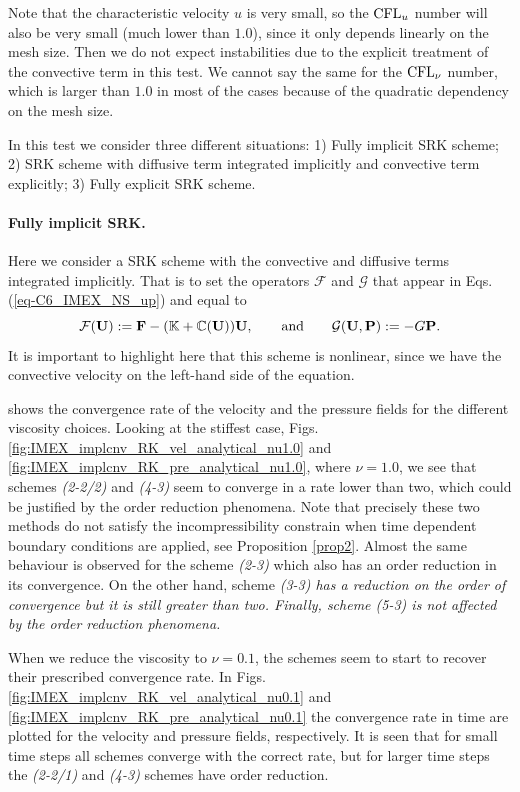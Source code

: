 Note that the characteristic velocity $u$ is very small, so the ${\rm CFL}_u$ number will also be very small (much lower than $1.0$), since it only depends linearly on the mesh size. Then we do not expect instabilities due to the explicit treatment of the convective term in this test. We cannot say the same for the ${\rm CFL}_\nu$ number, which is larger than $1.0$ in most of the cases because of the quadratic dependency on the mesh size.

In this test we consider three different situations: 1) Fully implicit SRK scheme; 2) SRK scheme with diffusive term integrated implicitly and convective term explicitly; 3) Fully explicit SRK scheme.

\paragraph{Fully implicit SRK.}

Here we consider a SRK scheme with the convective and diffusive terms integrated implicitly. That is to set the operators $\mathcal{F}$ and $\mathcal{G}$ that appear in Eqs. (\ref{eq-C6_IMEX_NS_up}) and  equal to
$$\mathcal{F}({\bf U}):={\bf F}-(\mathbb{K}+\mathbb{C}({\bf U})){\bf U},\quad\quad\mbox{and}\quad\quad\mathcal{G}({\bf U},{\bf P}):=-G{\bf P}.$$
It is important to highlight here that this scheme is nonlinear, since we have the convective velocity on the left-hand side of the equation.

 shows the convergence rate of the velocity and the pressure fields for the different viscosity choices. Looking at the stiffest case, Figs. \ref{fig:IMEX_implcnv_RK_vel_analytical_nu1.0} and \ref{fig:IMEX_implcnv_RK_pre_analytical_nu1.0}, where $\nu=1.0$, we see that schemes \textit{(2-2/2)} and \textit{(4-3)} seem to converge in a rate lower than two, which could be justified by the order reduction phenomena. Note that precisely these two methods do not satisfy the incompressibility constrain when time dependent boundary conditions are applied, see Proposition \ref{prop2}. Almost the same behaviour is observed for the scheme \textit{(2-3)} which also has an order reduction in its convergence. On the other hand, scheme \textit{(3-3) has a reduction on the order of convergence but it is still greater than two. Finally, scheme \textit{(5-3)} is not affected by the order reduction phenomena.}

When we reduce the viscosity to $\nu=0.1$, the schemes seem to start to recover their prescribed convergence rate. In Figs. \ref{fig:IMEX_implcnv_RK_vel_analytical_nu0.1} and  \ref{fig:IMEX_implcnv_RK_pre_analytical_nu0.1} the convergence rate in time are plotted for the velocity and pressure fields, respectively. It is seen that for small time steps all schemes converge with the correct rate, but for larger time steps the \textit{(2-2/1)} and \textit{(4-3)} schemes have order reduction.

